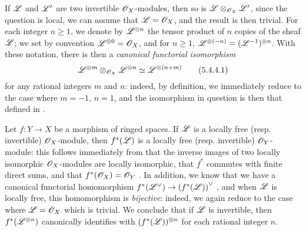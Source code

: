 \begin{env}[5.4.4]
\label{0.5.4.4}
If $\mathscr{L}$ and $\mathscr{L}'$ are two invertible $\mathscr{O}_X$-modules, then so is $\mathscr{L}\otimes_{\mathscr{O}_X}\mathscr{L}'$, since the question is local, we can assume that $\mathscr{L}=\mathscr{O}_X$, and the result is then trivial.
For each integer $n\geq 1$, we denote by $\mathscr{L}^{\otimes n}$ the tensor product of $n$ copies of the sheaf
$\mathscr{L}$; we set by convention $\mathscr{L}^{\otimes 0}=\mathscr{O}_X$, and for $n\geq 1$, $\mathscr{L}^{\otimes(-n)}=(\mathscr{L}^{-1})^{\otimes n}$.
With these notation, there is then a \emph{canonical functorial isomorphism}
\[
  \mathscr{L}^{\otimes m}\otimes_{\mathscr{O}_X}\mathscr{L}^{\otimes n}\simeq\mathscr{L}^{\otimes(n+m)}
  \tag{5.4.4.1}
\]
for any rational integers $m$ and $n$:
indeed, by definition, we immediately reduce to the case where $m=-1$, $n=1$, and the isomorphism in question is then that defined in .
\end{env}

\begin{env}[5.4.5]
\label{0.5.4.5}
Let $f:Y\to X$ be a morphism of ringed spaces.
If $\mathscr{L}$ is a locally free (resp. invertible) $\mathscr{O}_X$-module, then $f^*(\mathscr{L})$ is a locally free (resp. invertible) $\mathscr{O}_Y$-module:
this follows immediately from that the inverse images of two locally isomorphic $\mathscr{O}_X$-modules are locally isomorphic, that $f^*$ commutes with finite direct sums, and that $f^*(\mathscr{O}_X)=\mathscr{O}_Y$ .
In addition, we know that we have a canonical functorial homomorphism $f^*(\dual{\sh{L}})\to\dual{(f^*(\sh{L}))}$ , and when $\mathscr{L}$ is locally free, this homomorphism is \emph{bijective}:
indeed, we again reduce to the case where $\mathscr{L}=\mathscr{O}_X$ which is trivial.
We conclude that if $\mathscr{L}$ is invertible, then $f^*(\mathscr{L}^{\otimes n})$ canonically identifies with $(f^*(\mathscr{L}))^{\otimes n}$ for each rational integer $n$.
\end{env}

